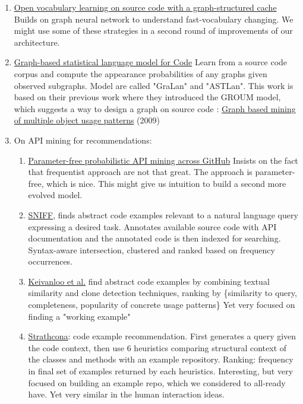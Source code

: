 \documentclass{article}
\begin{document}
\begin{multicols}{2}
\begin{enumerate}
\begin{enumerate}
        \end{enumerate}
    \item \href{https://arxiv.org/pdf/1810.08305.pdf}{Open vocabulary learning on source code with a graph-structured cache} Builds on graph neural network to understand fast-vocabulary changing. We might use some of these strategies in a second round of improvements of our architecture.
    \item \href{http://citeseerx.ist.psu.edu/viewdoc/download?doi=10.1.1.722.150&rep=rep1&type=pdf}{Graph-based statistical language model for Code} Learn from a source code corpus and compute the appearance probabilities of any graphs given observed subgraphs. Model are called "GraLan" and "ASTLan". This work is based on their previous work where they introduced the GROUM model, which suggests a way to design a graph on source code : \href{https://www.researchgate.net/publication/221560251_Graph-based_mining_of_multiple_object_usage_patterns}{Graph based mining of multiple object usage patterns} (2009)
    \item On API mining for recommendations:
        \begin{enumerate}
            \item \href{https://homepages.inf.ed.ac.uk/csutton/publications/fse2016.pdf}{Parameter-free probabilistic API mining across GitHub} Insists on the fact that frequentist approach are not that great. The approach is parameter-free, which is nice. This might give us intuition to build a second more evolved model.
            \item \href{https://www.researchgate.net/publication/221115320_SNIFF_A_Search_Engine_for_Java_Using_Free-Form_Queries}{SNIFF}, finds abstract code examples relevant to a natural language query expressing a desired task. Annotates available source code with API documentation and the annotated code is then indexed for searching. Syntax-aware intersection, clustered and ranked based on frequency occurrences.
            \item \href{http://post.queensu.ca/~zouy/files/icse2014.pdf}{Keivanloo et al.} find abstract code examples by combining textual similarity and clone detection techniques, ranking by \{similarity to query, completeness, popularity of concrete usage patterns\} Yet very focused on finding a "working example"
            \item \href{https://www.cs.ubc.ca/~rtholmes/papers/icse_2005_holmes.pdf}{Strathcona}: code example recommendation. First generates a query given the code context, then use 6 heuristics comparing structural context of the classes and methods with an example repository. Ranking: frequency in final set of examples returned by each heuristics.  Interesting, but very focused on building an example repo, which we considered to all-ready have. Yet very similar in the human interaction ideas.

\end{enumerate}
\end{enumerate}
\end{multicols}
\end{document}
